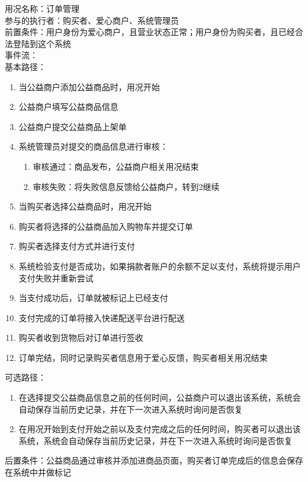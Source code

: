 \begin{framed}
\noindent
用况名称：订单管理\\
参与的执行者：购买者、爱心商户、系统管理员\\
前置条件：用户身份为爱心商户，且营业状态正常；用户身份为购买者，且已经合法登陆到这个系统\\
事件流：\\
基本路径：
\begin{enumerate}[itemsep=2pt,topsep=0pt,parsep=0pt,itemindent=1em]
    \item 当公益商户添加公益商品时，用况开始
    \item 公益商户填写公益商品信息
    \item 公益商户提交公益商品上架单
    \item 系统管理员对提交的商品信息进行审核：
    \begin{enumerate}[itemsep=2pt,topsep=0pt,parsep=0pt,itemindent=1em]
          \item 审核通过：商品发布，公益商户相关用况结束
          \item 审核失败：将失败信息反馈给公益商户，转到2继续
      \end{enumerate}
    \item 当购买者选择公益商品时，用况开始
    \item 购买者将选择的公益商品加入购物车并提交订单
    \item 购买者选择支付方式并进行支付
    \item 系统检验支付是否成功，如果捐款者账户的余额不足以支付，系统将提示用户支付失败并重新尝试
    \item 当支付成功后，订单就被标记上已经支付
    \item 支付完成的订单将接入快递配送平台进行配送
    \item 购买者收到货物后对订单进行签收
    \item 订单完结，同时记录购买者信息用于爱心反馈，购买者相关用况结束
\end{enumerate}
\noindent
可选路径：\par
         \begin{enumerate}[itemsep=2pt,topsep=0pt,parsep=0pt,itemindent=1em]  \item 在选择提交公益商品信息之前的任何时间，公益商户可以退出该系统，系统会自动保存当前历史记录，并在下一次进入系统时询问是否恢复 \item 在用况开始到支付开始之前以及支付完成之后的任何时间，购买者可以退出该系统，系统会自动保存当前历史记录，并在下一次进入系统时询问是否恢复  \end{enumerate} 
后置条件：公益商品通过审核并添加进商品页面，购买者订单完成后的信息会保存在系统中并做标记
\end{framed}

